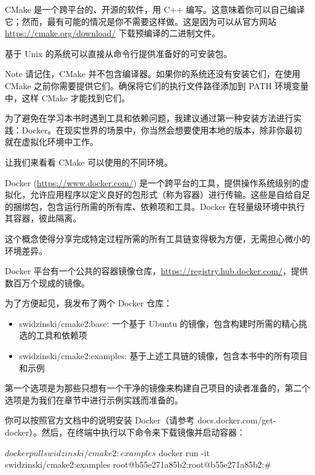 
CMake 是一个跨平台的、开源的软件，用 C++ 编写。这意味着你可以自己编译它；然而，最有可能的情况是你不需要这样做。这是因为可以从官方网站 \url{https://cmake.org/download/} 下载预编译的二进制文件。

基于 Unix 的系统可以直接从命令行提供准备好的可安装包。

\begin{myNotic}{Note}
请记住，CMake 并不包含编译器。如果你的系统还没有安装它们，在使用 CMake 之前你需要提供它们。确保将它们的执行文件路径添加到 PATH 环境变量中，这样 CMake 才能找到它们。

为了避免在学习本书时遇到工具和依赖问题，我建议通过第一种安装方法进行实践：Docker。在现实世界的场景中，你当然会想要使用本地的版本，除非你最初就在虚拟化环境中工作。
\end{myNotic}

让我们来看看 CMake 可以使用的不同环境。


Docker (\url{https://www.docker.com/}) 是一个跨平台的工具，提供操作系统级别的虚拟化，允许应用程序以定义良好的包形式（称为容器）进行传输。这些是自给自足的捆绑包，包含运行所需的所有库、依赖项和工具。Docker 在轻量级环境中执行其容器，彼此隔离。

这个概念使得分享完成特定过程所需的所有工具链变得极为方便，无需担心微小的环境差异。

Docker 平台有一个公共的容器镜像仓库，\url{https://registry.hub.docker.com/}，提供数百万个现成的镜像。

为了方便起见，我发布了两个 Docker 仓库：

\begin{itemize}
\item
swidzinski/cmake2:base: 一个基于 Ubuntu 的镜像，包含构建时所需的精心挑选的工具和依赖项

\item
swidzinski/cmake2:examples: 基于上述工具链的镜像，包含本书中的所有项目和示例
\end{itemize}

第一个选项是为那些只想有一个干净的镜像来构建自己项目的读者准备的，第二个选项是为我们在章节中进行示例实践而准备的。

你可以按照官方文档中的说明安装 Docker（请参考 docs.docker.com/get-docker）。然后，在终端中执行以下命令来下载镜像并启动容器：

\begin{shell}
$ docker pull swidzinski/cmake2:examples
$ docker run -it swidzinski/cmake2:examples
root@b55e271a85b2:root@b55e271a85b2:#
\end{shell}

